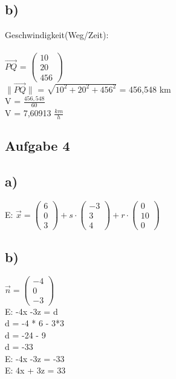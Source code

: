 \documentclass{article}
\begin{document}
	\subsection*{b)}
	Geschwindigkeit(Weg/Zeit): \\ \\
	$\vec{PQ}$ =
	$\left(
	\begin{array}{c}
	10\\20\\456
	\end{array}
	\right)$ \\
	$\|\vec{PQ}\|$ = 
	$\sqrt{10^2+20^2+456^2}$ = 456,548 km \\
	V = $\frac{456,548}{60}$ \\
	V = 7,60913 $\frac{km}{h}$
	\subsection*{Aufgabe 4}
	\subsection*{a)}
	E: $\vec{x} = 
	\left(
	\begin{array}{c}
	6 \\ 0 \\ 3
	\end{array}
	\right)
	+
	s \cdot
	\left(
	\begin{array}{c}
	-3 \\ 3 \\ 4
	\end{array}
	\right)
	+
	r \cdot
	\left(
	\begin{array}{c}
	0 \\ 10 \\ 0
	\end{array}
	\right)
	$
	\subsection*{b)}
	$\vec{n} = 
	\left(
	\begin{array}{c}
	-4 \\ 0 \\ -3
	\end{array}
	\right)$  \\
	E: -4x -3z = d \\
	d = -4 * 6 - 3*3 \\
	d = -24 - 9 \\
	d = -33 \\
	E: -4x -3z = -33 \\
	E: 4x + 3z = 33
\end{document}
